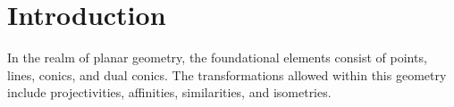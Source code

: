 \section{Introduction}

In the realm of planar geometry, the foundational elements consist of points, lines, conics, and dual conics. 
The transformations allowed within this geometry include projectivities, affinities, similarities, and isometries.